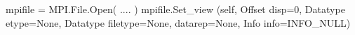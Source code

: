 mpifile = MPI.File.Open( .... )
mpifile.Set_view
  (self,
   Offset disp=0, Datatype etype=None, Datatype filetype=None,
   datarep=None, Info info=INFO_NULL)
